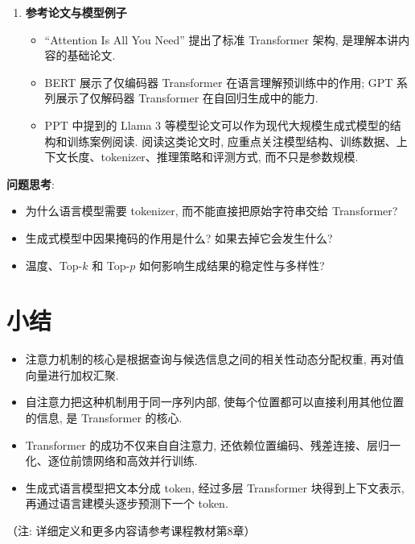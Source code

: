 \documentclass{../nndlcourse}
\begin{document}
\begin{enumerate}
\begin{itemize}
      \item 上下文长度 (context length) 决定模型一次能读取多少 token. 更长上下文能容纳更多历史信息, 但普通自注意力的 $O(L^2)$ 开销会随长度迅速增加.
      \item 参数规模决定模型可学习的函数复杂度, 但更大参数量并不自动保证更好效果. 数据质量、训练目标、优化方法、推理策略和对齐方式都会影响模型行为.
      \item 为了处理长序列, 研究中常使用局部注意力、块稀疏注意力、滑动窗口注意力或混合全局 token 等策略. 其共同目标是在保留重要上下文交互的同时降低注意力矩阵的计算成本.
    \end{itemize}
  \item \textbf{参考论文与模型例子}
    \begin{itemize}
      \item ``Attention Is All You Need'' 提出了标准 Transformer 架构, 是理解本讲内容的基础论文.
      \item BERT 展示了仅编码器 Transformer 在语言理解预训练中的作用; GPT 系列展示了仅解码器 Transformer 在自回归生成中的能力.
      \item PPT 中提到的 Llama 3 等模型论文可以作为现代大规模生成式模型的结构和训练案例阅读. 阅读这类论文时, 应重点关注模型结构、训练数据、上下文长度、tokenizer、推理策略和评测方式, 而不只是参数规模.
    \end{itemize}
\end{enumerate}

\textbf{问题思考}:
\begin{itemize}
  \item 为什么语言模型需要 tokenizer, 而不能直接把原始字符串交给 Transformer?
  \item 生成式模型中因果掩码的作用是什么? 如果去掉它会发生什么?
  \item 温度、Top-$k$ 和 Top-$p$ 如何影响生成结果的稳定性与多样性?
\end{itemize}

\section{小结}

\begin{itemize}
  \item 注意力机制的核心是根据查询与候选信息之间的相关性动态分配权重, 再对值向量进行加权汇聚.
  \item 自注意力把这种机制用于同一序列内部, 使每个位置都可以直接利用其他位置的信息, 是 Transformer 的核心.
  \item Transformer 的成功不仅来自自注意力, 还依赖位置编码、残差连接、层归一化、逐位前馈网络和高效并行训练.
  \item 生成式语言模型把文本分成 token, 经过多层 Transformer 块得到上下文表示, 再通过语言建模头逐步预测下一个 token.
\end{itemize}

（注: 详细定义和更多内容请参考课程教材第8章）
\end{document}
